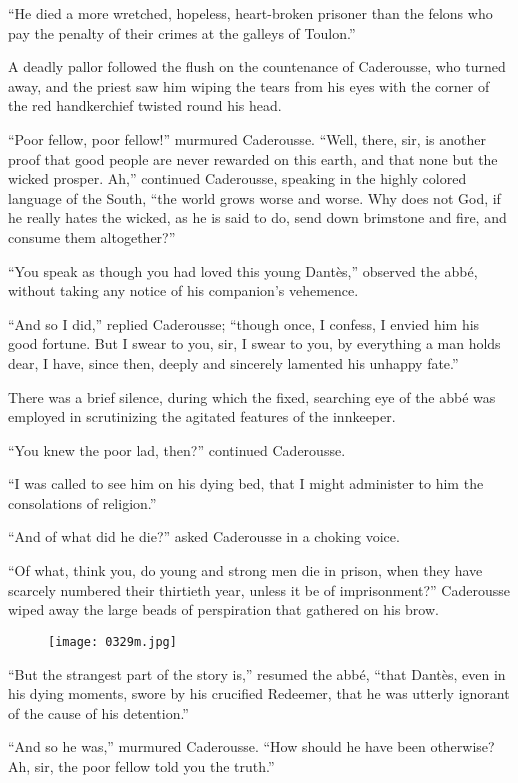 “He died a more wretched, hopeless, heart-broken prisoner than the
felons who pay the penalty of their crimes at the galleys of Toulon.”

A deadly pallor followed the flush on the countenance of Caderousse,
who turned away, and the priest saw him wiping the tears from his eyes
with the corner of the red handkerchief twisted round his head.

“Poor fellow, poor fellow!” murmured Caderousse. “Well, there, sir, is
another proof that good people are never rewarded on this earth, and
that none but the wicked prosper. Ah,” continued Caderousse, speaking
in the highly colored language of the South, “the world grows worse and
worse. Why does not God, if he really hates the wicked, as he is said
to do, send down brimstone and fire, and consume them altogether?”

“You speak as though you had loved this young Dantès,” observed the
abbé, without taking any notice of his companion’s vehemence.

“And so I did,” replied Caderousse; “though once, I confess, I envied
him his good fortune. But I swear to you, sir, I swear to you, by
everything a man holds dear, I have, since then, deeply and sincerely
lamented his unhappy fate.”

There was a brief silence, during which the fixed, searching eye of the
abbé was employed in scrutinizing the agitated features of the
innkeeper.

“You knew the poor lad, then?” continued Caderousse.

“I was called to see him on his dying bed, that I might administer to
him the consolations of religion.”

“And of what did he die?” asked Caderousse in a choking voice.

“Of what, think you, do young and strong men die in prison, when they
have scarcely numbered their thirtieth year, unless it be of
imprisonment?” Caderousse wiped away the large beads of perspiration
that gathered on his brow.

\begin{figure}[h]
\texttt{[image: 0329m.jpg]}
\end{figure}

“But the strangest part of the story is,” resumed the abbé, “that
Dantès, even in his dying moments, swore by his crucified Redeemer,
that he was utterly ignorant of the cause of his detention.”

“And so he was,” murmured Caderousse. “How should he have been
otherwise? Ah, sir, the poor fellow told you the truth.”

